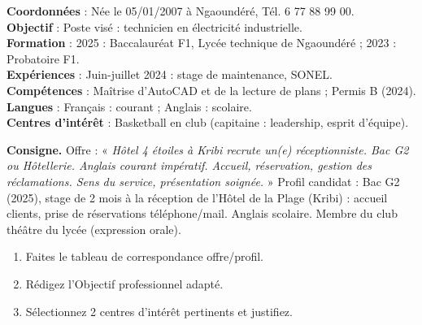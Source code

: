 \documentclass[11pt]{article}
\begin{document}
\begin{corrige}
\textbf{Coordonnées} : Née le 05/01/2007 à Ngaoundéré, Tél. 6 77 88 99 00.\\
\textbf{Objectif} : Poste visé : technicien en électricité industrielle.\\
\textbf{Formation} : 2025 : Baccalauréat F1, Lycée technique de Ngaoundéré ; 2023 : Probatoire F1.\\
\textbf{Expériences} : Juin-juillet 2024 : stage de maintenance, SONEL.\\
\textbf{Compétences} : Maîtrise d'AutoCAD et de la lecture de plans ; Permis B (2024).\\
\textbf{Langues} : Français : courant ; Anglais : scolaire.\\
\textbf{Centres d'intérêt} : Basketball en club (capitaine : leadership, esprit d'équipe).
\end{corrige}

\begin{exercice}
\textbf{Consigne.} Offre : « \emph{Hôtel 4 étoiles à Kribi recrute un(e) réceptionniste. Bac G2 ou Hôtellerie. Anglais courant impératif. Accueil, réservation, gestion des réclamations. Sens du service, présentation soignée.} »
Profil candidat : Bac G2 (2025), stage de 2 mois à la réception de l'Hôtel de la Plage (Kribi) : accueil clients, prise de réservations téléphone/mail. Anglais scolaire. Membre du club théâtre du lycée (expression orale).
\begin{enumerate}
\item Faites le tableau de correspondance offre/profil.
\item Rédigez l'Objectif professionnel adapté.
\item Sélectionnez 2 centres d'intérêt pertinents et justifiez.
\end{enumerate}
\end{exercice}
\end{document}
